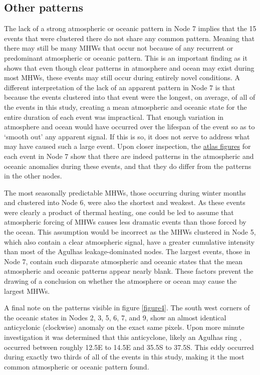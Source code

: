 \documentclass[utf8]{frontiersSCNS}
\begin{document}
\subsection{Other patterns}
The lack of a strong atmospheric or oceanic pattern in Node 7 implies that the 15 events that were clustered there do not share any common pattern. Meaning that there may still be many MHWs that occur not because of any recurrent or predominant atmospheric or oceanic pattern. This is an important finding as it shows that even though clear patterns in atmosphere and ocean may exist during most MHWs, these events may still occur during entirely novel conditions. A different interpretation of the lack of an apparent pattern in Node 7 is that because the events clustered into that event were the longest, on average, of all of the events in this study, creating a mean atmospheric and oceanic state for the entire duration of each event was impractical. That enough variation in atmosphere and ocean would have occurred over the lifespan of the event so as to `smooth out' any apparent signal. If this is so, it does not serve to address what may have caused such a large event. Upon closer inspection, the \href{https://github.com/schrob040/AHW/tree/master/graph/synoptic}{atlas figures} for each event in Node 7 show that there are indeed patterns in the atmospheric and oceanic anomalies during these events, and that they do differ from the patterns in the other nodes.

The most seasonally predictable MHWs, those occurring during winter months and clustered into Node 6, were also the shortest and weakest. As these events were clearly a product of thermal heating, one could be led to assume that atmospheric forcing of MHWs causes less dramatic events than those forced by the ocean. This assumption would be incorrect as the MHWs clustered in Node 5, which also contain a clear atmospheric signal, have a greater cumulative intensity than most of the Agulhas leakage-dominated nodes. The largest events, those in Node 7, contain such disparate atmospheric and oceanic states that the mean atmospheric and oceanic patterns appear nearly blank. These factors prevent the drawing of a conclusion on whether the atmosphere or ocean may cause the largest MHWs.

A final note on the patterns visible in figure \ref{figure4}. The south west corners of the oceanic states in Nodes 2, 3, 5, 6, 7, and 9, show an almost identical anticyclonic (clockwise) anomaly on the exact same pixels. Upon more minute investigation it was determined that this anticyclone, likely an Agulhas ring \citep{Hutchings2009}, occurred between roughly 12.5\degree E to 14.5\degree E and 35.5\degree S to 37.5\degree S. This eddy occurred during exactly two thirds of all of the events in this study, making it the most common atmospheric or oceanic pattern found.
\end{document}
